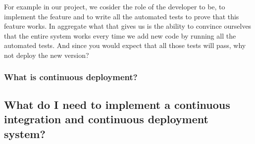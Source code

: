 \documentclass{article}
\begin{document}
For example in our project, we cosider the role of the developer to
be, to implement the feature and to write all the automated tests to
prove that this feature works.
%
In aggregate what that gives us is the ability to convince ourselves
that the entire system works every time we add new code by running all
the automated tests.
%
And since you would expect that all those tests will pass, why not
deploy the new version?



\subsubsection*{What is continuous deployment?}

\subsection{What do I need to implement a continuous integration and continuous deployment system?}
\end{document}
